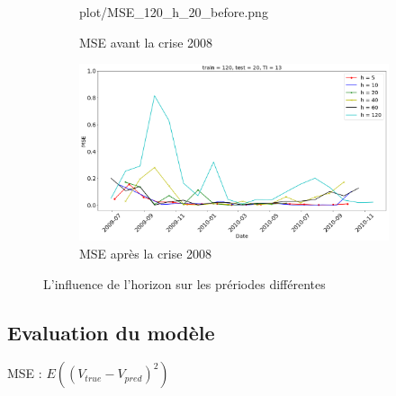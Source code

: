 \begin{figure}[H]
\begin{subfigure}{.5\textwidth}
	{plot/MSE_120_h_20_before.png}
	\caption{MSE avant la crise 2008}
	\label{fig:Horizon_before}
	\end{subfigure}%
	\begin{subfigure}{.5\textwidth}
	\centering
	\includegraphics[width=.9\linewidth, scale=0.2]
	{plot/MSE_120_h_20_after.png}
	\caption{MSE après la crise 2008}
	\label{fig:Horizon_after}
	\end{subfigure}
\caption{L'influence de l'horizon sur les prériodes différentes}
\label{fig:ME_Trainingset}
\end{figure}


\subsection{Evaluation du modèle}

MSE : $ E((V_{true} - V_{pred})^2) $

